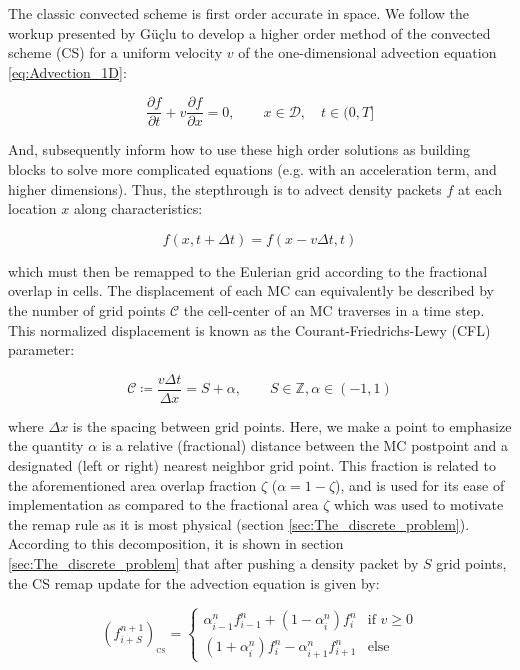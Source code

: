 \documentclass[11pt,titlepage]{report}
\begin{document}
\indent\indent The classic convected scheme is first order accurate in space. We follow the workup presented by G\"{u}\c{c}lu \cite{Guclu14} to develop a higher order method of the convected scheme (CS) for a uniform velocity $v$ of the one-dimensional advection equation \eqref{eq:Advection_1D}:

$$\frac{\partial f}{\partial t} + v\frac{\partial f}{\partial x} = 0 \label{eq:Advection_1D} , \qquad x\in\mathcal{D}, \quad t \in (0,T]$$

\noindent And, subsequently inform how to use these high order solutions as building blocks to solve more complicated equations (e.g. with an acceleration term, and higher dimensions). Thus, the stepthrough is to advect density packets $f$ at each location $x$ along characteristics:

$$f(x,t + \Delta t) = f(x - v\Delta t, t)$$

\noindent which must then be remapped to the Eulerian grid according to the fractional overlap in cells. The displacement of each MC can equivalently be described by the number of grid points $\mathcal{C}$ the cell-center of an MC traverses in a time step. This normalized displacement is known as the Courant-Friedrichs-Lewy (CFL) parameter:

\begin{equation}\mathcal{C} \coloneqq \frac{v\Delta t}{\Delta x} =  S + \alpha , \qquad S\in\mathbb{Z}, \alpha\in(-1,1)\label{eq:CFL_first}\end{equation}

\noindent where $\Delta x$ is the spacing between grid points. Here, we make a point to emphasize the quantity $\alpha$ is a relative (fractional) distance between the MC postpoint and a designated (left or right) nearest neighbor grid point. This fraction is related to the aforementioned area overlap fraction $\zeta$ ($\alpha = 1 - \zeta$), and is used for its ease of implementation as compared to the fractional area $\zeta$ which was used to motivate the remap rule as it is most physical (section \ref{sec:The_discrete_problem}). According to this decomposition, it is shown in section \ref{sec:The_discrete_problem} that after pushing a density packet by $S$ grid points, the CS remap update for the advection equation is given by:

 \begin{equation}
\label{eq:CS_update_FD_alpha}
 (f_{i+S}^{n+1})_{_{\mathrm{CS}}} =
  \begin{cases}
   \alpha_{i-1}^{n} f_{i-1}^n + (1 - \alpha_i^n)f_i^n & \text{if } v \geq 0 \\[0.75em]
   (1 + \alpha_i^n)f_i^n - \alpha_{i+1}^n f_{i+1}^n & \text{else }
  \end{cases}
\end{equation}
\end{document}

